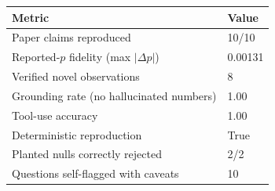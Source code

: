 \begin{tabular}{p{8.5cm}l}
\toprule
Metric & Value \\
\midrule
Paper claims reproduced & 10/10 \\
Reported-$p$ fidelity (max $|\Delta p|$) & 0.00131 \\
Verified novel observations & 8 \\
Grounding rate (no hallucinated numbers) & 1.00 \\
Tool-use accuracy & 1.00 \\
Deterministic reproduction & True \\
Planted nulls correctly rejected & 2/2 \\
Questions self-flagged with caveats & 10 \\
\bottomrule
\end{tabular}
